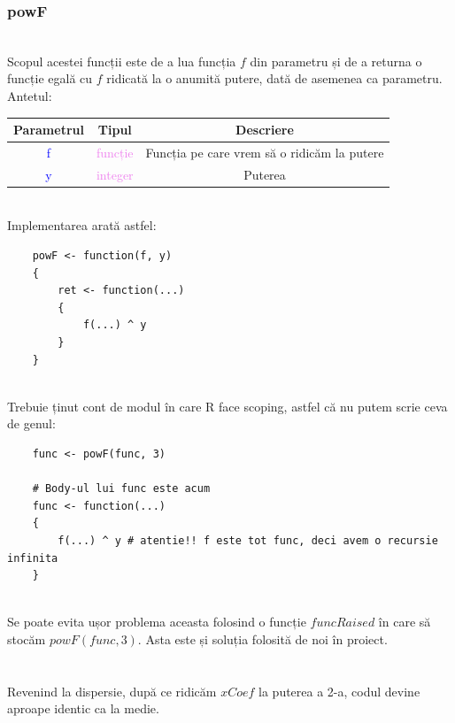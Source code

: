 \documentclass[12pt]{article}
\begin{document}
\subsubsection{powF} \hfill \\
\indent Scopul acestei funcții este de a lua funcția $f$ din parametru și de a returna o funcție egală cu $f$ ridicată la o anumită putere, dată de asemenea ca parametru. Antetul:
\begin{center}
	\begin{tabular}{|| c | c | c ||}
		\hline
		Parametrul & Tipul & Descriere \\
		\hline
		\textcolor{blue}{f} & \textcolor{violet}{funcție} & Funcția pe care vrem să o ridicăm la putere\\
		\hline
		\textcolor{blue}{y} & \textcolor{violet}{integer} & Puterea\\
		\hline
	\end{tabular}
\end{center}\hfill \\
\indent Implementarea arată astfel:
\begin{lstlisting}
	powF <- function(f, y)
	{
		ret <- function(...)
		{
			f(...) ^ y
		}
	}
\end{lstlisting} \hfill \\
\indent Trebuie ținut cont de modul în care R face scoping, astfel că nu putem scrie ceva de genul:
\begin{lstlisting}
	func <- powF(func, 3)
	
	# Body-ul lui func este acum
	func <- function(...)
	{
		f(...) ^ y # atentie!! f este tot func, deci avem o recursie infinita
	}	
\end{lstlisting} \hfill \\
\indent Se poate evita ușor problema aceasta folosind o funcție $funcRaised$ în care să stocăm $powF(func, 3)$. Asta este și soluția folosită de noi în proiect.\\
\noindent\makebox[\linewidth]{\rule{\paperwidth}{0.4pt}}
\\\\
\indent Revenind la dispersie, după ce ridicăm $xCoef$ la puterea a 2-a, codul devine aproape identic ca la medie.\\
\end{document}
